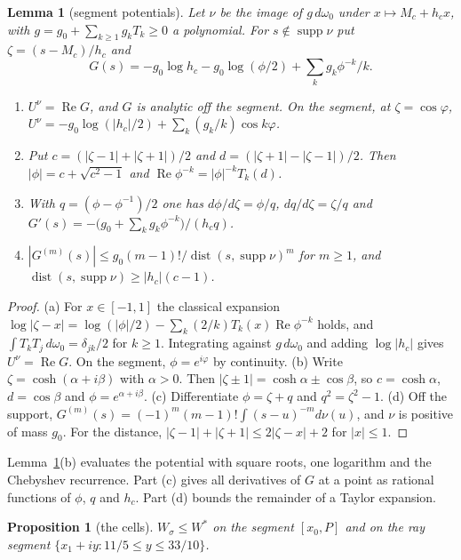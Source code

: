 \documentclass[11pt]{amsart}
\newtheorem{lemma}[theorem]{Lemma}
\newtheorem{proposition}[theorem]{Proposition}
\theoremstyle{definition}
\theoremstyle{remark}
\numberwithin{equation}{section}
\begin{document}
\begin{lemma}[segment potentials]\label{lem:joukowski}
Let $\nu$ be the image of $g\,d\omega_0$ under $x\mapsto M_c+h_cx$, with $g=g_0+\sum_{k\ge1}g_kT_k\ge0$ a polynomial. For
$s\notin\operatorname{supp}\nu$ put $\zeta=(s-M_c)/h_c$ and
\[
 G(s)=-g_0\log h_c-g_0\log(\phi/2)+\sum_kg_k\phi^{-k}/k .
\]
\begin{enumerate}[label=(\alph*)]
\item $U^\nu=\operatorname{Re}G$, and $G$ is analytic off the segment. On the segment, at $\zeta=\cos\varphi$,
 $U^\nu=-g_0\log(|h_c|/2)+\sum_k(g_k/k)\cos k\varphi$.
\item Put $c=(|\zeta-1|+|\zeta+1|)/2$ and $d=(|\zeta+1|-|\zeta-1|)/2$. Then $|\phi|=c+\sqrt{c^2-1}$ and
 $\operatorname{Re}\phi^{-k}=|\phi|^{-k}T_k(d)$.
\item With $q=(\phi-\phi^{-1})/2$ one has $d\phi/d\zeta=\phi/q$, $dq/d\zeta=\zeta/q$ and
 $G'(s)=-\bigl(g_0+\sum_kg_k\phi^{-k}\bigr)/(h_cq)$.
\item $|G^{(m)}(s)|\le g_0(m-1)!/\operatorname{dist}(s,\operatorname{supp}\nu)^m$ for $m\ge1$, and
 $\operatorname{dist}(s,\operatorname{supp}\nu)\ge|h_c|(c-1)$.
\end{enumerate}
\end{lemma}

\begin{proof}
(a) For $x\in[-1,1]$ the classical expansion $\log|\zeta-x|=\log(|\phi|/2)-\sum_k(2/k)T_k(x)\operatorname{Re}\phi^{-k}$
holds, and $\int T_kT_j\,d\omega_0=\delta_{jk}/2$ for $k\ge1$. Integrating against $g\,d\omega_0$ and adding
$\log|h_c|$ gives $U^\nu=\operatorname{Re}G$. On the segment, $\phi=e^{i\varphi}$ by continuity. (b) Write
$\zeta=\cosh(\alpha+i\beta)$ with $\alpha>0$. Then $|\zeta\pm1|=\cosh\alpha\pm\cos\beta$, so $c=\cosh\alpha$,
$d=\cos\beta$ and $\phi=e^{\alpha+i\beta}$. (c) Differentiate $\phi=\zeta+q$ and $q^2=\zeta^2-1$. (d) Off the support,
$G^{(m)}(s)=(-1)^m(m-1)!\int(s-u)^{-m}d\nu(u)$, and $\nu$ is positive of mass $g_0$. For the distance,
$|\zeta-1|+|\zeta+1|\le2|\zeta-x|+2$ for $|x|\le1$.
\end{proof}

Lemma~\ref{lem:joukowski}(b) evaluates the potential with square roots, one logarithm and the Chebyshev recurrence.
Part (c) gives all derivatives of $G$ at a point as rational functions of $\phi$, $q$ and $h_c$. Part (d) bounds the
remainder of a Taylor expansion.

\begin{proposition}[the cells]\label{prop:cells}
$W_\sigma\le W^*$ on the segment $[x_0,P]$ and on the ray segment $\{x_1+iy:11/5\le y\le33/10\}$.
\end{proposition}
\end{document}

